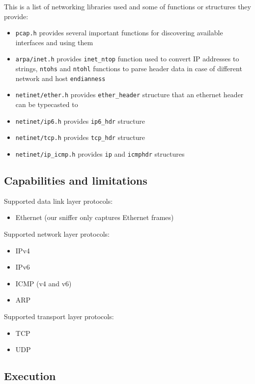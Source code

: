 \documentclass[a4paper]{article}
\begin{document}
  This is a list of networking libraries used and some of functions or 
  structures they provide:
  \begin{itemize}
    \item \verb|pcap.h| provides several important functions for discovering
      available interfaces and using them
    \item \verb|arpa/inet.h| provides \verb|inet_ntop| function used to 
      convert IP addresses to strings, \verb|ntohs| and \verb|ntohl|
      functions to parse header data in case of different network and host 
      \verb|endianness|
    \item \verb|netinet/ether.h| provides \verb|ether_header| structure
      that an ethernet header can be typecasted to
    \item \verb|netinet/ip6.h| provides \verb|ip6_hdr| structure
    \item \verb|netinet/tcp.h| provides \verb|tcp_hdr| structure
    \item \verb|netinet/ip_icmp.h| provides \verb|ip| and \verb|icmphdr|
      structures
  \end{itemize}


  \subsection{Capabilities and limitations}

  Supported data link layer protocols:
  \begin{itemize}
    \item Ethernet (our sniffer only captures Ethernet frames)
  \end{itemize}

  \noindent
  Supported network layer protocols:
  \begin{itemize}
    \item IPv4
    \item IPv6
    \item ICMP (v4 and v6)
    \item ARP
  \end{itemize}

  \noindent
  Supported transport layer protocols:
  \begin{itemize}
    \item TCP
    \item UDP
  \end{itemize}


  \subsection{Execution}
\end{document}
